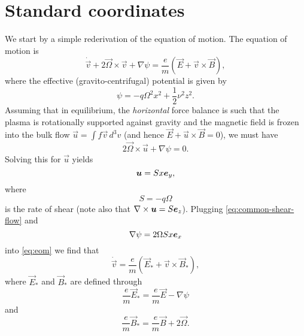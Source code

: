 \documentclass[aps,pre,notitlepage,amsmath,amssymb,amsfonts,nobibnotes,nofootinbib,superscriptaddress,onecolumn,a4paper,10pt]{revtex4-1}
\begin{document}
\section{Standard coordinates}
We start by a simple rederivation of the equation of motion.
The equation of motion is
\begin{equation}
  \label{eq:eom}
  \dot{\vec{v}} + 2\vec{\Omega}\times\vec{v} + \nabla\psi =
  \frac{e}{m}(\vec{E} + \vec{v}\times\vec{B}),
\end{equation}
where the effective (gravito-centrifugal) potential is given by
\begin{equation}
  \label{eq:tidal-potential}
  \psi = -q\Omega^2 x^2 + \frac{1}{2}\nu^2 z^2.
\end{equation}
Assuming that in equilibrium, the \emph{horizontal} force balance is such that
the plasma is rotationally supported against gravity and the magnetic field is
frozen into the bulk flow $\vec{u}=\int\!f\vec{v}\,d^3v$ (and hence
$\vec{E}+\vec{u}\times\vec{B}=0$), we must have
\begin{equation}
  2\vec{\Omega}\times\vec{u} + \nabla\psi = 0.
\end{equation}
Solving this for $\vec{u}$ yields
\begin{equation}
  \label{eq:common-shear-flow}
  \bm{u} = Sx\bm{e}_y,
\end{equation}
where
\begin{equation}
  S = -q\Omega
\end{equation}
is the rate of shear (note also that $\nabla\times\bm{u}=S\bm{e}_z$). Plugging
\cref{eq:common-shear-flow} and
\begin{equation}
   \nabla\psi = 2\Omega Sx\bm{e}_x
\end{equation}
into \cref{eq:eom} we find that
\begin{equation}
  \dot{\vec{v}} =
  \frac{e}{m}(\vec{E}_\ast + \vec{v}\times\vec{B}_\ast),
\end{equation}
where $\vec{E}_\ast$ and $\vec{B}_\ast$ are defined through
\begin{equation}
  \frac{e}{m}\vec{E}_\ast = \frac{e}{m}\vec{E} - \nabla\psi
\end{equation}
and
\begin{equation}
  \frac{e}{m}\vec{B}_\ast = \frac{e}{m}\vec{B} + 2\vec{\Omega}.
\end{equation}
\end{document}
